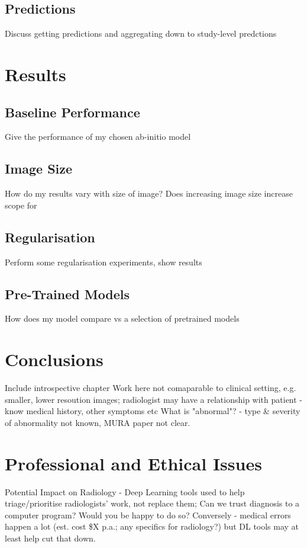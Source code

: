 \documentclass[11pt]{article} %
\theoremstyle{plain}
\theoremstyle{definition}
\begin{document}
\subsection{Predictions}
Discuss getting predictions and aggregating down to study-level predctions



\newpage
\section{Results}

\subsection{Baseline Performance}
Give the performance of my chosen ab-initio model

\subsection{Image Size}
How do my results vary with size of image? Does increasing image size increase scope for

\subsection{Regularisation}
Perform some regularisation experiments, show results

\subsection{Pre-Trained Models}
How does my model compare vs a selection of pretrained models



\newpage
\section{Conclusions}
Include introspective chapter
Work here not comaparable to clinical setting, e.g. smaller, lower resoution images; radiologist may have a relationship with patient - know medical history, other symptoms etc
What is "abnormal"? - type & severity of abnormality not known, MURA paper not clear.



\newpage
\section{Professional and Ethical Issues}
Potential Impact on Radiology - Deep Learning tools used to help triage/prioritise radiologists' work, not replace them; 
Can we trust diagnosis to a computer program? Would you be happy to do so? 
Conversely - medical errors happen a lot (est. cost \$X p.a.; any specifics for radiology?) but DL tools may at least help cut that down.
\end{document}
